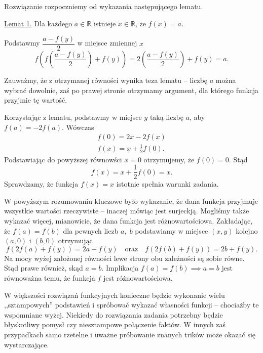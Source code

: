 \newpage


\noindent
Rozwiązanie rozpoczniemy od wykazania następującego lematu.

\vspace{10px}

\noindent
\underline{Lemat 1.} Dla każdego $a \in \mathbb{R}$ istnieje $x \in \mathbb{R}$, że $f(x) = a$.

\vspace{5px}

\noindent
Podstawmy $\dfrac{a - f(y)}{2}$ w miejsce zmiennej $x$
\[
    f\left(f\left(\frac{a - f(y)}{2}\right) + f(y)\right) = 2(\frac{a - f(y)}{2}) + f(y) = a.
\]

\noindent
Zauważmy, że z otrzymanej równości wynika teza lematu – liczbę $a$ można wybrać dowolnie, zaś po prawej stronie otrzymamy argument, dla którego funkcja przyjmie tę wartość.

\vspace{10px}

\noindent
Korzystając z lematu, podstawmy w miejsce $y$ taką liczbę $a$, aby $f(a) = -2f(a)$. Wówczas
\begin{gather*}
    f(0) = 2x - 2f(x) \\
    f(x) = x  + \frac{1}{2}f(0).
\end{gather*}
Podstawiając do powyższej równowści $x = 0$ otrzymujemy, że $f(0) = 0$. Stąd
\[
    f(x) = x + \frac{1}{2}f(0) = x.
\]
Sprawdzamy, że funkcja $f(x) = x$ istotnie spełnia warunki zadania.

\vspace{20px}

\noindent
W powyższym rozumowaniu kluczowe było wykazanie, że dana funkcja przyjmuje wszystkie wartości rzeczywiste -- inaczej mówiąc jest surjeckją. Mogliśmy także wykazać więcej, mianowicie, że dana funkcja jest różnowartościowa. Zakładając, że $f(a) = f(b)$ dla pewnych liczb $a,\;b$ podstawiamy w miejsce $(x, y)$ kolejno $(a, 0)$ i $(b, 0)$ otrzymując
\[
    f(2f(a) + f(y)) = 2a + f(y) \quad \text{oraz} \quad f(2f(b) + f(y)) = 2b + f(y).
\]
Na mocy wyżej założonej równości lewe strony obu zależności są sobie równe. Stąd prawe również, skąd $a = b$. Implikacja $f(a) = f(b) \implies a = b$ jest równoważna temu, że funkcja $f$ jest różnowartościowa.

\vspace{10px}

\noindent
W większości rozwiązań funkcyjnych konieczne będzie wykonanie wielu ,,sztampowych'' podstawień i spróbować wykazać własności funkcji -- chociażby te wspomniane wyżej. Niekiedy do rozwiązania zadania potrzebny będzie błyskotliwy pomysł czy niesztampowe połączenie faktów. W innych zaś przypadkach samo rzetelne i uważne próbowanie znanych trików może okazać się wystarczające. 

\vspace{10px}
